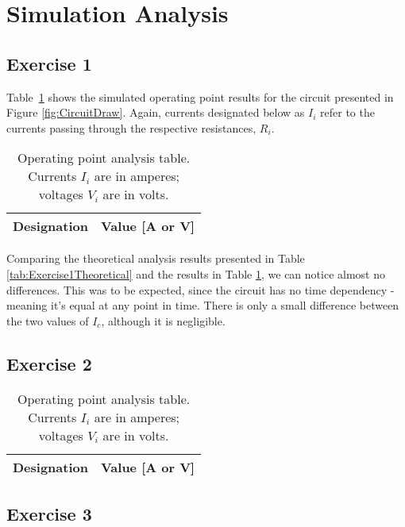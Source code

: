 \section{Simulation Analysis}
\label{sec:simulation}

\subsection{Exercise 1}

Table~\ref{tab:Exercise1Simulation} shows the simulated operating point results for the circuit presented in Figure \ref{fig:CircuitDraw}. Again, currents designated below as $I_i$ refer to the currents passing through the respective resistances, $R_i$.

\begin{table}[H]
  \centering
  \begin{tabular}{|c|c|}
    \hline    
    {\bf Designation} & {\bf Value [A or V]} \\ \hline
    
  \end{tabular}
  \caption{Operating point analysis table. Currents $I_i$ are in amperes; voltages $V_i$ are in volts.}
  \label{tab:Exercise1Simulation}
\end{table}

Comparing the theoretical analysis results presented in Table \ref{tab:Exercise1Theoretical} and the results in Table \ref{tab:Exercise1Simulation}, we can notice almost no differences. This was to be expected, since the circuit has no time dependency - meaning it's equal at any point in time. There is only a small difference between the two values of $I_c$, although it is negligible.

\subsection{Exercise 2}

\begin{table}[H]
  \centering
  \begin{tabular}{|c|c|}
    \hline    
    {\bf Designation} & {\bf Value [A or V]} \\ \hline
    
  \end{tabular}
  \caption{Operating point analysis table. Currents $I_i$ are in amperes; voltages $V_i$ are in volts.}
  \label{tab:Exercise2Simulation}
\end{table}


\subsection{Exercise 3}

